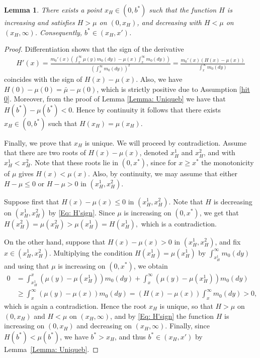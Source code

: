 \documentclass[12pt]{article}
\newtheorem{lemma}[theorem]{Lemma}
\begin{document}
\begin{lemma} \label{Lemma: Hshape}
    There exists a point $x_H \in(0,b^*)$ such that the function $H$ is increasing and satisfies $H> \mu$ on $(0,x_H)$, and decreasing with $H<\mu$ on $(x_H,\infty)$. Consequently, $b^* \in (x_H, x')$.
\end{lemma}
\begin{proof}
Differentiation shows that the sign of the derivative 
\begin{eqnarray} \label{Eq: H'sign}
    H'(x) = \frac{m_0'(x)\left(\int_{x}^{\infty} \mu(y)m_0(dy) -\mu(x)\int_{x}^{\infty} m_0(dy)\right)}{\left(\int_{x}^{\infty} m_0(dy)\right)^2}
    = \frac{m_0'(x)\left(H(x) -\mu(x)\right)}{\int_{x}^{\infty} m_0(dy)}
\end{eqnarray}
coincides with the sign of  $H(x)-\mu(x)$.
Also, we have $H(0)-\mu(0) = \bar{\mu}-\mu(0)$, which is strictly positive due to Assumption \ref{hit 0}. Moreover, from the proof of Lemma \ref{Lemma: Uniqueb} we have that $H(b^*) - \mu(b^*) < 0$. Hence by continuity it follows that there exists $x_H \in (0,b^*)$ such that $H(x_H) = \mu(x_H)$.

Finally, we prove that $x_H$ is unique. We will proceed by contradiction. Assume that there are two roots of $H(x) - \mu(x)$, denoted $x_H^1$ and $x_H^2$, and with $x_H^1 < x_H^2$. Note that these roots lie in $(0,x^*)$, since for $x \geq x^*$ the monotonicity of $\mu$ gives $H(x)<\mu(x)$. Also, by continuity, we may assume that either $H-\mu\leq 0$ or $H-\mu>0$ in $(x_H^1,x_H^2)$.

Suppose first that $H(x)-\mu(x) \leq 0$ in $(x_H^1, x_H^2)$. Note that $H$ is decreasing on $(x_H^1, x_H^2)$ by \eqref{Eq: H'sign}. Since $\mu$ is increasing on $(0,x^*)$, we get that $H(x_H^2) = \mu(x_H^2) > \mu(x_H^1) = H(x_H^1),$ which is a contradiction. %


On the other hand, suppose that $H(x)-\mu(x) > 0$ in $(x_H^1, x_H^2)$, and fix $x \in (x_H^1, x_H^2)$. Multiplying the condition $H(x_H^1)=\mu(x_H^1)$ by $\int_{x_H^1}^\infty m_0(dy)$ and using that $\mu$ is increasing on $(0,x^*)$, we obtain
\begin{align*}
    0 & = \int_{x_H^1}^{x} \left(\mu(y)-\mu(x_H^1)\right) m_0(dy)
     + \int_{x}^{\infty} \left(\mu(y)-\mu(x_H^1)\right) m_0(dy) \\
    & \geq \int_{x}^{\infty} \left(\mu(y)-\mu(x)\right) m_0(dy)
     = \left(H(x)-\mu(x)\right)\int_{x}^{\infty} m_0(dy) > 0,
\end{align*}
which is again a contradiction. Hence the root $x_H$ is unique, so that $H > \mu$ on $(0, x_H)$ and $H < \mu$ on $(x_H, \infty)$, and by \eqref{Eq: H'sign} the function $H$ is increasing on $(0, x_H)$ and decreasing on $(x_H,\infty)$. Finally, since $H(b^*)<\mu(b^*)$, we have $b^* > x_H$, and thus $b^* \in (x_H, x')$ by Lemma~\ref{Lemma: Uniqueb}.

\end{proof}
\end{document}
